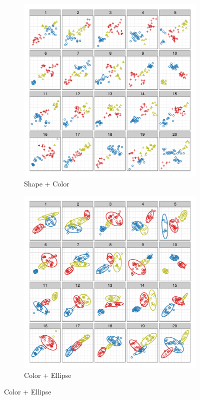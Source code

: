 \documentclass[11pt]{isuthesis}\usepackage[]{graphicx}\usepackage[]{color}
\begin{document}
\begin{figure}[ht]
\begin{subfigure}[t]{0.28\linewidth}
\end{subfigure}
\begin{subfigure}[t]{0.28\linewidth}
  \caption{Shape + Color}
  \includegraphics[width=\linewidth]{fig-samplepics-4}
\end{subfigure}
\begin{subfigure}[t]{0.28\linewidth}
  \caption{Color + Ellipse}
  \includegraphics[width=\linewidth]{fig-samplepics-5}

\end{subfigure}
\end{figure}
\end{document}
